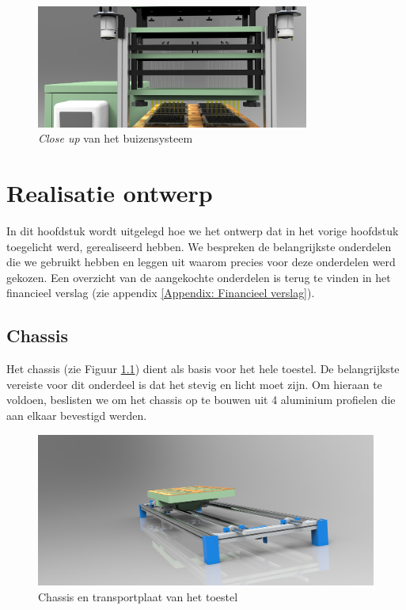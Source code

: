 \documentclass[a4paper,twoside,kulak]{kulakreport} %
\begin{document}
\begin{figure}[h]
	\centering
	\includegraphics[width=0.8\textwidth]{renderingBuizensysteem.jpg}
	\caption{\textit{Close up} van het buizensysteem}
	\label{fig: close up buizensysteem}
	
\end{figure} 


\chapter{Realisatie ontwerp}

In dit hoofdstuk wordt uitgelegd hoe we het ontwerp dat in het vorige hoofdstuk toegelicht werd, gerealiseerd hebben. We bespreken de belangrijkste onderdelen die we gebruikt hebben en leggen uit waarom precies voor deze onderdelen werd gekozen. Een overzicht van de aangekochte onderdelen is terug te vinden in het financieel verslag (zie appendix \ref{Appendix: Financieel verslag}).

\section{Chassis}

Het chassis (zie Figuur \ref{fig: chassis en transportplaat}) dient als basis voor het hele toestel. De belangrijkste vereiste voor dit onderdeel is dat het stevig en licht moet zijn. Om hieraan te voldoen, beslisten we om het chassis op te bouwen uit 4 aluminium profielen die aan elkaar bevestigd werden. 

\begin{figure}
	\centering
	\includegraphics[width=1\textwidth]{chassis+transportplaat.jpg}
	\caption{Chassis en transportplaat van het toestel}
	\label{fig: chassis en transportplaat}
	
\end{figure} 
\end{document}
